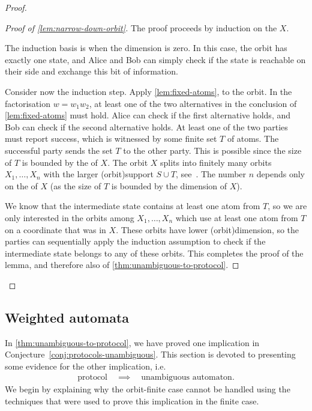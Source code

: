 \begin{proof}
\begin{proof}[Proof of \cref{lem:narrow-down-orbit}]
  The proof proceeds by induction on the  $X$.
    
  The induction basis is when the dimension is zero. In this case, the orbit
  has exactly one state, and Alice and Bob can simply check  if the state is
  reachable on their side and exchange this bit of information.

  Consider now the induction step. Apply \cref{lem:fixed-atoms}, to the
  orbit. In the factorisation $w = w_1 w_2$, at least one of the two
  alternatives in the conclusion of \cref{lem:fixed-atoms} must hold. Alice
  can check if the first alternative holds, and Bob can check if the second
  alternative holds.  At least one of the two parties must report success,
  which is witnessed by some finite set $T$ of atoms. The successful party sends the
  set $T$ to the other party. This is possible since the size of $T$ is
  bounded by the  of $X$. 
  The orbit $X$ splits into finitely many
  orbits $X_1,\ldots,X_n$ with the larger \kl(orbit){support} $S \cup T$, see~\cite[Lemma
  10.9]{bojanczyk_slightly}. The number $n$ depends only on the  
  of $X$ (as the size of $T$ is bounded by the dimension of $X$).

  We know that the intermediate state contains at least one atom from $T$, so
  we are only interested in the orbits among $X_1,\ldots,X_n$ which use at
  least one atom from $T$ on a coordinate that was  in $X$. 
  These orbits
  have lower \kl(orbit){dimension}, so the parties can sequentially apply the induction
  assumption to check if the intermediate state belongs to any of these
  orbits. This completes the proof of the lemma, and therefore also of
  \cref{thm:unambiguous-to-protocol}.
\end{proof}
\end{proof}


\subsection{Weighted automata}
\label{sec:weighted-automata-atoms}

In \cref{thm:unambiguous-to-protocol}, we have proved one implication in Conjecture~\ref{conj:protocols-unambiguous}.
This section is devoted to presenting some evidence for the other implication, i.e.
\begin{align}\label{eq:missing-orbit-finite-implication}
\text{protocol} \quad \implies \quad \text{unambiguous automaton}.
\end{align}
We begin by explaining why the orbit-finite case cannot be handled using the
techniques that were used to prove this implication in the finite case.

